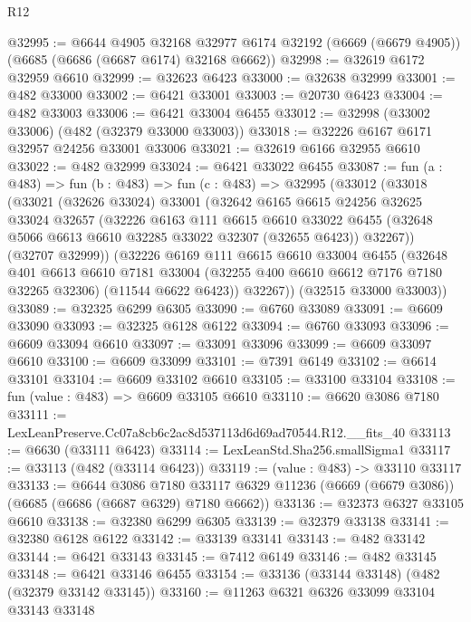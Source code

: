 \begin{lexlean}{R12}
\begin{coremodule}
@32995 := @6644
    @4905
    @32168
    @32977
    @6174
    @32192
    (@6669 (@6679 @4905))
    (@6685 (@6686 (@6687 @6174) @32168 @6662))
@32998 := @32619 @6172 @32959 @6610
@32999 := @32623 @6423
@33000 := @32638 @32999
@33001 := @482 @33000
@33002 := @6421 @33001
@33003 := @20730 @6423
@33004 := @482 @33003
@33006 := @6421 @33004 @6455
@33012 := @32998 (@33002 @33006) (@482 (@32379 @33000 @33003))
@33018 := @32226 @6167 @6171 @32957 @24256 @33001 @33006
@33021 := @32619 @6166 @32955 @6610
@33022 := @482 @32999
@33024 := @6421 @33022 @6455
@33087 := fun (a : @483) =>
  fun (b : @483) =>
  fun (c : @483) =>
  @32995
    (@33012
      (@33018
        (@33021
          (@32626 @33024)
          @33001
          (@32642
            @6165
            @6615
            @24256
            @32625
            @33024
            @32657
            (@32226
              @6163
              @111
              @6615
              @6610
              @33022
              @6455
              (@32648 @5066 @6613 @6610 @32285 @33022 @32307 (@32655 @6423))
              @32267))
          (@32707 @32999))
        (@32226
          @6169
          @111
          @6615
          @6610
          @33004
          @6455
          (@32648
            @401
            @6613
            @6610
            @7181
            @33004
            (@32255 @400 @6610 @6612 @7176 @7180 @32265 @32306)
            (@11544 @6622 @6423))
          @32267))
      (@32515 @33000 @33003))
@33089 := @32325 @6299 @6305
@33090 := @6760 @33089
@33091 := @6609 @33090
@33093 := @32325 @6128 @6122
@33094 := @6760 @33093
@33096 := @6609 @33094 @6610
@33097 := @33091 @33096
@33099 := @6609 @33097 @6610
@33100 := @6609 @33099
@33101 := @7391 @6149
@33102 := @6614 @33101
@33104 := @6609 @33102 @6610
@33105 := @33100 @33104
@33108 := fun (value : @483) => @6609 @33105 @6610
@33110 := @6620 @3086 @7180
@33111 := LexLeanPreserve.Cc07a8cb6c2ac8d537113d6d69ad70544.R12.__fits_40
@33113 := @6630 (@33111 @6423)
@33114 := LexLeanStd.Sha256.smallSigma1
@33117 := @33113 (@482 (@33114 @6423))
@33119 := (value : @483) -> @33110 @33117
@33133 := @6644
    @3086
    @7180
    @33117
    @6329
    @11236
    (@6669 (@6679 @3086))
    (@6685 (@6686 (@6687 @6329) @7180 @6662))
@33136 := @32373 @6327 @33105 @6610
@33138 := @32380 @6299 @6305
@33139 := @32379 @33138
@33141 := @32380 @6128 @6122
@33142 := @33139 @33141
@33143 := @482 @33142
@33144 := @6421 @33143
@33145 := @7412 @6149
@33146 := @482 @33145
@33148 := @6421 @33146 @6455
@33154 := @33136 (@33144 @33148) (@482 (@32379 @33142 @33145))
@33160 := @11263 @6321 @6326 @33099 @33104 @33143 @33148

\end{coremodule}
\end{lexlean}
